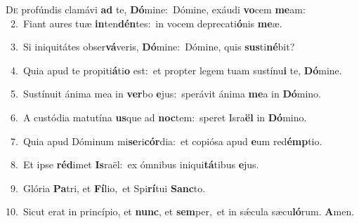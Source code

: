 \lettrine{\initial\textcolor{\initialcolor}{D}}{e} profúndis clamávi \textbf{ad} te, \textbf{Dó}\-mine:~\star Dómine, exáudi \textbf{vo}\-cem \textbf{me}\-am:\\
{\numbfont\textcolor{\numbcolor}{~2.}}~Fiant aures tuæ \textbf{in}\-ten\-\textbf{dén}\-tes:~\star in vocem deprecati\-\textbf{ó}\-nis \textbf{me}\-æ.\par
{\numbfont\textcolor{\numbcolor}{~3.}}~Si iniquitátes obser\-\textbf{vá}\-veris, \textbf{Dó}\-mine:~\star Dómine, quis \textbf{sus}\-ti\-\textbf{né}\-bit?\par
{\numbfont\textcolor{\numbcolor}{~4.}}~Quia apud te propiti\-\textbf{á}\-ti\textbf{o} est:~\star et propter legem tuam sustínu\textbf{i} te, \textbf{Dó}\-mine.\par
{\numbfont\textcolor{\numbcolor}{~5.}}~Sustínuit ánima mea in \textbf{ver}\-bo \textbf{e}\-jus:~\star sperávit ánima \textbf{me}\-a in \textbf{Dó}\-mino.\par
{\numbfont\textcolor{\numbcolor}{~6.}}~A custódia matutína \textbf{us}\-que ad \textbf{noc}\-tem:~\star speret Isra\textbf{ël} in \textbf{Dó}\-mino.\par
{\numbfont\textcolor{\numbcolor}{~7.}}~Quia apud Dóminum mi\-\textbf{se}\-ri\-\textbf{cór}\-dia:~\star et copiósa apud \textbf{e}\-um red\-\textbf{émp}\-tio.\par
{\numbfont\textcolor{\numbcolor}{~8.}}~Et ipse \textbf{réd}\-imet \textbf{Is}\-raël:~\star ex ómnibus iniqui\-\textbf{tá}\-tibus \textbf{e}\-jus.\par
{\numbfont\textcolor{\numbcolor}{~9.}}~Glória \textbf{Pa}\-tri, et \textbf{Fí}\-lio,~\star et Spi\-\textbf{rí}\-tui \textbf{Sanc}\-to.\par
{\numbfont\textcolor{\numbcolor}{10.}}~Sicut erat in princípio, et \textbf{nunc}\-, et \textbf{sem}\-per,~\star et in sǽcula sæcu\-\textbf{ló}\-rum. \textbf{A}\-men.\par
